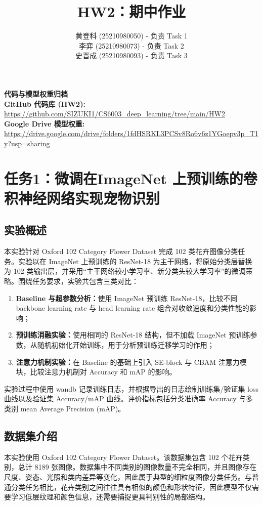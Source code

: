 \documentclass{article}
\title{HW2：期中作业}
\author{
    黄登科 (25210980050) - 负责 Task 1 \\
    李弈 (25210980073) - 负责 Task 2 \\
    史晋成 (25210980093) - 负责 Task 3
}
\begin{document}
\maketitle

\vspace{-1.5em}
\begin{center}
    \textbf{代码与模型权重归档} \\
    \vspace{0.5em}
    \textbf{GitHub 代码库 (HW2):} \url{https://github.com/SIZUKI1/CS6003_deep_learning/tree/main/HW2} \\
    \textbf{Google Drive 模型权重:} \url{https://drive.google.com/drive/folders/1fdHSRKL3PCSv8Ro6v6z1YGoepv3p_T1y?usp=sharing}
\end{center}
\vspace{1.5em}
\section{任务1：微调在ImageNet 上预训练的卷积神经网络实现宠物识别}

\subsection{实验概述}
本实验针对 Oxford 102 Category Flower Dataset 完成 102 类花卉图像分类任务。实验以在 ImageNet 上预训练的 ResNet-18 为主干网络，将原始分类层替换为 102 类输出层，并采用“主干网络较小学习率、新分类头较大学习率”的微调策略。围绕任务要求，实验共包含三类对比：
\begin{enumerate}
    \item \textbf{Baseline 与超参数分析：}使用 ImageNet 预训练 ResNet-18，比较不同 backbone learning rate 与 head learning rate 组合对收敛速度和分类性能的影响；
    \item \textbf{预训练消融实验：}使用相同的 ResNet-18 结构，但不加载 ImageNet 预训练参数，从随机初始化开始训练，用于分析预训练迁移学习的作用；
    \item \textbf{注意力机制实验：}在 Baseline 的基础上引入 SE-block 与 CBAM 注意力模块，比较注意力机制对 Accuracy 和 mAP 的影响。
\end{enumerate}

实验过程中使用 wandb 记录训练日志，并根据导出的日志绘制训练集/验证集 loss 曲线以及验证集 Accuracy/mAP 曲线。评价指标包括分类准确率 Accuracy 与多类别 mean Average Precision (mAP)。

\subsection{数据集介绍}
本实验使用 Oxford 102 Category Flower Dataset。该数据集包含 102 个花卉类别，总计 8189 张图像。数据集中不同类别的图像数量不完全相同，并且图像存在尺度、姿态、光照和类内差异等变化，因此属于典型的细粒度图像分类任务。与普通分类任务相比，花卉类别之间往往具有相似的颜色和形状特征，因此模型不仅需要学习低层纹理和颜色信息，还需要捕捉更具判别性的局部结构。
\end{document}
